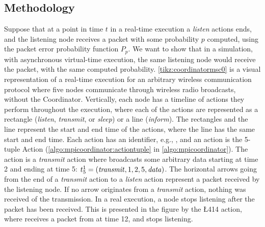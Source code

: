 \subsection{Methodology}\label{sec:correctnessmethods}
Suppose that at a point in time $t$ in a real-time execution a \textit{listen} actions ends, and the listening
node receives a packet with some probability $p$ computed, using the packet error probability function $P_p$.
We want to show that in a simulation, with asynchronous virtual-time execution, the same listening node would
receive the packet, with the same computed probability. \autoref{tikz:coordinatormsc0} is a visual
representation of a real-time execution for an arbitrary wireless communication protocol where five nodes
communicate through wireless radio broadcasts, without the Coordinator. Vertically, each node has a timeline
of actions they perform throughout the execution, where each of the actions are represented as a rectangle
(\textit{listen}, \textit{transmit}, or \textit{sleep}) or a line (\textit{inform}). The rectangles and the
line represent the start and end time of the actions, where the line has the same start and end time. Each
action has an identifier, e.g., , and an action is the 5-tuple Action
(\autoref{algo:mpicoordinator:actiontuple} in \autoref{algo:mpicoordinator}). The  action is a
\textit{transmit} action where  broadcasts some arbitrary data starting at time 2 and ending at time
5: $t^{1}_{5} = (\mathit{transmit}, 1, 2, 5, \mathit{data})$. The horizontal arrows going from the end of a
\textit{transmit} action to a \textit{listen} action represent a packet received by the listening node. If no
arrow originates from a \textit{transmit} action, nothing was received of the transmission. In a real
execution, a node stops listening after the packet has been received. This is presented in the figure by
the \L{4}{14} action, where  receives a packet from  at time 12, and stops listening.
\medbreak

